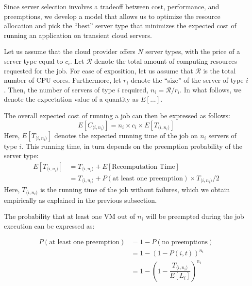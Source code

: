 Since server selection involves a tradeoff between cost, performance, and preemptions, we develop a model that allows us to optimize the resource allocation and pick the ``best'' server type that minimizes the expected cost of running an application on transient cloud servers. 


Let us assume that the cloud provider offers $N$ server types, with the price of a server type equal to $c_i$. 
Let $\mathcal{R}$ denote the total amount of computing resources requested for the job. For ease of exposition, let us assume that $\mathcal{R}$ is the total number of CPU cores.
Furthermore, let $r_i$ denote the ``size'' of the server of type $i$.
Then, the number of servers of type $i$ required, $n_i = \mathcal{R}/r_i$. In what follows, we denote the expectation value of a quantity as $E[\ldots]$. 

The overall expected cost of running a job can then be expressed as follows:
\begin{equation}
  \label{eq:e-cost}
  E[C_{\langle i,n_i \rangle}] = n_i\times c_i \times E[T_{\langle i,n_i \rangle}]
\end{equation}
Here, $E[T_{\langle i,n_i \rangle}]$ denotes the expected running time of the job on $n_i$ servers of type $i$. 
This running time, in turn depends on the preemption probability of the server type:
\begin{align}
  \label{eq:et1}
  E[T_{\langle i,n_i \rangle}] &= T_{\langle i,n_i \rangle} + E[\text{Recomputation Time}] \\
  &= T_{\langle i,n_i \rangle} + P(\text{at least one preemption})\times T_{\langle i,n_i \rangle}/2   
\end{align}
Here, $T_{\langle i,n_i \rangle}$ is the running time of the job without failures, which we obtain empirically as explained in the previous subsection.

The probability that at least one VM out of $n_i$ will be preempted during the job execution can be expressed as:

\begin{align}
  \label{eq:pfail1}
  P(\text{at least one preemption}) &= 1-P(\text{no preemptions}) \\
                                 &= 1-\left(1-P\left(i, t\right)\right)^{n_i} \\
                                 &= 1-\left(1-\dfrac{T_{\langle i,n_i \rangle}}{E[L_i]}\right)^{n_i}      
\end{align}

